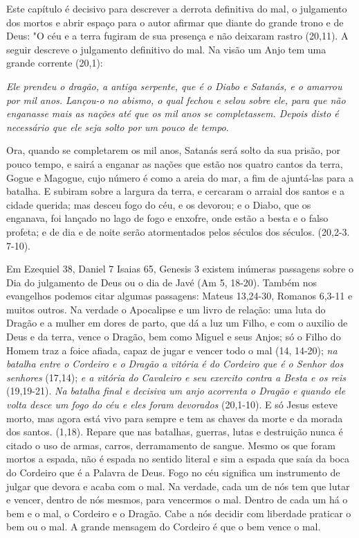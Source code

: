 \documentclass[
]{book}
\begin{document}
Este capítulo é decisivo para descrever a derrota definitiva do mal, o julgamento dos mortos e abrir espaço para o autor afirmar que diante do grande trono e de Deus: "O céu e a terra fugiram de sua presença e não deixaram rastro (20,11). A seguir descreve o julgamento definitivo do mal. Na visão um Anjo tem uma grande corrente (20,1):

\emph{Ele prendeu o dragão, a antiga serpente, que é o Diabo e Satanás, e o amarrou por mil anos. Lançou-o no abismo, o qual fechou e selou sobre ele, para que não enganasse mais as nações até que os mil anos se completassem. Depois disto é necessário que ele seja solto por um pouco de tempo}.

Ora, quando se completarem os mil anos, Satanás será solto da sua prisão, por pouco tempo, e sairá a enganar as nações que estão nos quatro cantos da terra, Gogue e Magogue, cujo número é como a areia do mar, a fim de ajuntá-las para a batalha. E subiram sobre a largura da terra, e cercaram o arraial dos santos e a cidade querida; mas desceu fogo do céu, e os devorou; e o Diabo, que os enganava, foi lançado no lago de fogo e enxofre, onde estão a besta e o falso profeta; e de dia e de noite serão atormentados pelos séculos dos séculos. (20,2-3. 7-10).

Em Ezequiel 38, Daniel 7 Isaias 65, Genesis 3 existem inúmeras passagens sobre o Dia do julgamento de Deus ou o dia de Javé (Am 5, 18-20). Também nos evangelhos podemos citar algumas passagens: Mateus 13,24-30, Romanos 6,3-11 e muitos outros. Na verdade o Apocalipse e um livro de relação: uma luta do Dragão e a mulher em dores de parto, que dá a luz um Filho, e com o auxilio de Deus e da terra, vence o Dragão, bem como Miguel e seus Anjos; só o Filho do Homem traz a foice afiada, capaz de jugar e vencer todo o mal (14, 14-20); \emph{na batalha entre o Cordeiro e o Dragão a vitória é do Cordeiro que é o Senhor dos senhores} (17,14); \emph{e a vitória do Cavaleiro e seu exercito contra a Besta e os reis} (19,19-21). \emph{Na batalha final e decisiva um anjo acorrenta o Dragão e quando ele volta desce um fogo do céu e eles foram devorados} (20,1-10). E só Jesus esteve morto, mas agora está vivo para sempre e tem as chaves da morte e da morada dos santos. (1,18). Repare que nas batalhas, guerras, lutas e destruição nunca é citado o uso de armas, carros, derramamento de sangue. Mesmo os que foram mortos a espada, não é espada no sentido literal e sim a espada que saía da boca do Cordeiro que é a Palavra de Deus. Fogo no céu significa um instrumento de julgar que devora e acaba com o mal. Na verdade, cada um de nós tem que lutar e vencer, dentro de nós mesmos, para vencermos o mal. Dentro de cada um há o bem e o mal, o Cordeiro e o Dragão. Cabe a nós decidir com liberdade praticar o bem ou o mal. A grande mensagem do Cordeiro é que o bem vence o mal.
\end{document}
